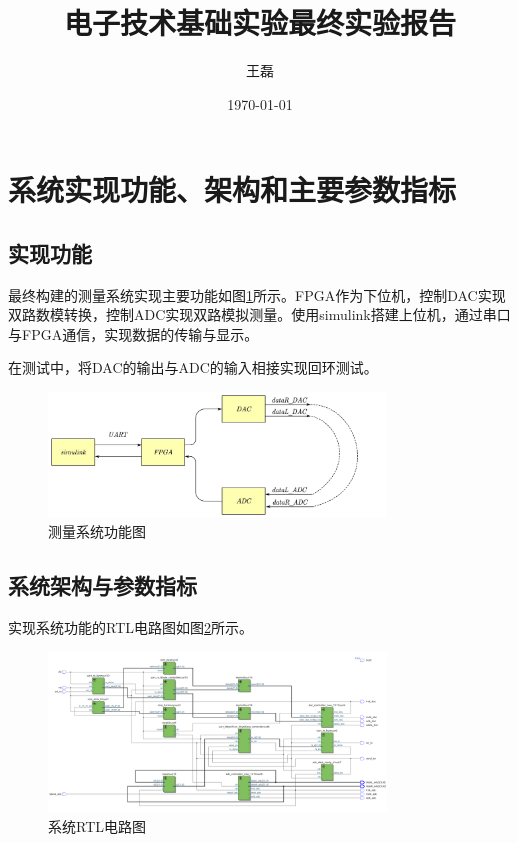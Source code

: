 \documentclass[UTF8]{ctexart}
\title{电子技术基础实验最终实验报告}
\author{王磊\quad2022012972}
\date{\today}
\begin{document}
\maketitle
\section{系统实现功能、架构和主要参数指标}
\subsection{实现功能}
最终构建的测量系统实现主要功能如图\ref{fig:system}所示。FPGA作为下位机，控制DAC实现双路数模转换，控制ADC实现双路模拟测量。使用simulink搭建上位机，通过串口与FPGA通信，实现数据的传输与显示。

在测试中，将DAC的输出与ADC的输入相接实现回环测试。

\begin{figure}[!ht]
    \centering
    \includegraphics[width=0.8\textwidth]{system.png}
    \caption{测量系统功能图}
    \label{fig:system}
\end{figure}

\subsection{系统架构与参数指标}
实现系统功能的RTL电路图如图\ref{fig:rtl}所示。

\begin{figure}[!ht]
    \centering
    \includegraphics[width=0.8\textwidth]{rtl.png}
    \caption{系统RTL电路图}
    \label{fig:rtl}
\end{figure}
\end{document}
